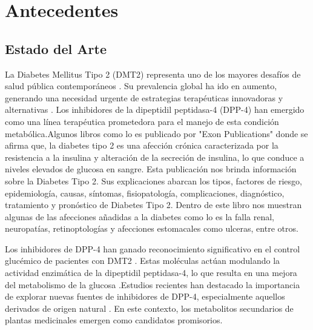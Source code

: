 \chapter{Antecedentes}
\renewcommand{\figurename}{Figura}

\section{Estado del Arte}
La Diabetes Mellitus Tipo 2 (DMT2) representa uno de los mayores desafíos de salud pública contemporáneos \cite{GuevaraTirado2024}. Su prevalencia global ha ido en aumento, generando una necesidad urgente de estrategias terapéuticas innovadoras y alternativas \cite{Rachin2024}. Los inhibidores de la dipeptidil peptidasa-4 (DPP-4) han emergido como una línea terapéutica prometedora para el manejo de esta condición metabólica.Algunos libros como lo es publicado por "Exon Publications" donde se afirma que, la diabetes tipo 2 es una afección crónica caracterizada por la resistencia a la insulina y alteración de la secreción de insulina, lo que conduce a niveles elevados de glucosa en sangre. Esta publicación nos brinda información sobre la Diabetes Tipo 2. Sus explicaciones abarcan los tipos, factores de riesgo, epidemiología, causas, síntomas, fisiopatología, complicaciones, diagnóstico, tratamiento y pronóstico de Diabetes Tipo 2. Dentro de este libro nos muestran algunas de las afecciones añadidas a la diabetes como lo es la falla renal, neuropatías, retinoptologías y afecciones estomacales como ulceras, entre otros\cite{Publications2024}.

Los inhibidores de DPP-4 han ganado reconocimiento significativo en el control glucémico de pacientes con DMT2 \cite{Masyita2024}. Estas moléculas actúan modulando la actividad enzimática de la dipeptidil peptidasa-4, lo que resulta en una mejora del metabolismo de la glucosa \cite{Singhal2024,Shao2024}.Estudios recientes han destacado la importancia de explorar nuevas fuentes de inhibidores de DPP-4, especialmente aquellos derivados de origen natural \cite{Maya2024, DeLaTorre2024}. En este contexto, los metabolitos secundarios de plantas medicinales emergen como candidatos promisorios.

